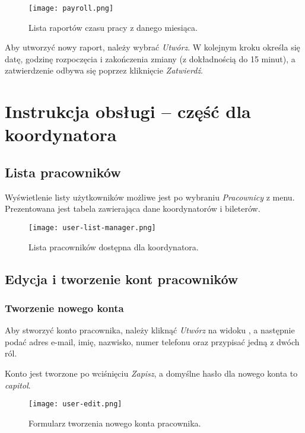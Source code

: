 \documentclass[shortabstract]{iithesis}
\begin{document}
\begin{figure}[h]
    \centering
    \texttt{[image: payroll.png]}
    \caption{Lista raportów czasu pracy z danego miesiąca.}
    \label{fig:payroll}
\end{figure}

Aby utworzyć nowy raport, należy wybrać \textit{Utwórz}. W kolejnym kroku określa się datę, godzinę rozpoczęcia i zakończenia zmiany (z dokładnością do 15 minut), a zatwierdzenie odbywa się poprzez kliknięcie \textit{Zatwierdź}.


\newpage

\section{Instrukcja obsługi – część dla koordynatora}

\subsection{Lista pracowników}
\label{user-list}

Wyświetlenie listy użytkowników możliwe jest po wybraniu \textit{Pracownicy} z menu. Prezentowana jest tabela zawierająca dane koordynatorów i bileterów.

\begin{figure}[h]
    \centering
    \texttt{[image: user-list-manager.png]}
    \caption{Lista pracowników dostępna dla koordynatora.}
    \label{fig:user-list-manager}
\end{figure}

\subsection{Edycja i tworzenie kont pracowników}

\subsubsection{Tworzenie nowego konta}

Aby stworzyć konto pracownika, należy kliknąć \textit{Utwórz} na widoku , a następnie podać adres e-mail, imię, nazwisko, numer telefonu oraz przypisać jedną z dwóch ról.

Konto jest tworzone po wciśnięciu \textit{Zapisz}, a domyślne hasło dla nowego konta to \textit{capitol}.

\begin{figure}[h]
    \centering
    \texttt{[image: user-edit.png]}
    \caption{Formularz tworzenia nowego konta pracownika.}
    \label{fig:user-edit}
\end{figure}
\end{document}
